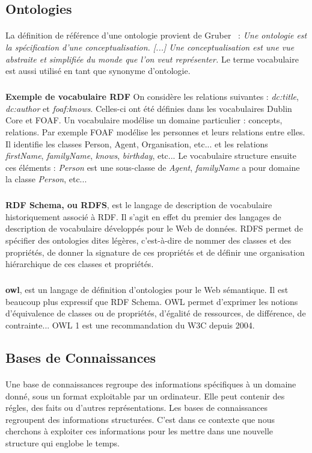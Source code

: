 \documentclass[12pt,a4]{report}
\begin{document}
\subsection{Ontologies}
\paragraph{}
La définition de référence d’une ontologie provient de Gruber~\cite{gruber1995}  : {\it Une ontologie est la spécification d’une conceptualisation. [...] Une conceptualisation est une vue abstraite et simplifiée du monde que l’on veut représenter.} Le terme vocabulaire est aussi utilisé en tant que synonyme d’ontologie.
\subparagraph{}
\textbf{Exemple de vocabulaire RDF} On considère les relations suivantes : \textit{dc:title}, \textit{dc:author} et \textit{foaf:knows}. Celles-ci ont été définies dans les vocabulaires Dublin Core et FOAF. Un vocabulaire modélise un domaine particulier : concepts, relations. Par exemple FOAF modélise les personnes et leurs relations entre elles. Il identifie les classes Person, Agent, Organisation, etc... et les relations \textit{firstName}, \textit{familyName}, \textit{knows}, \textit{birthday}, etc... Le vocabulaire structure ensuite ces  éléments : \textit{Person} est une sous-classe de \textit{Agent}, \textit{familyName} a pour domaine la classe \textit{Person}, etc...
\subparagraph{}
\textbf{RDF Schema, ou RDFS}, est le langage de description de vocabulaire historiquement associé à RDF. Il s'agit en effet du premier des langages de description de vocabulaire développés pour le Web de données. RDFS permet de spécifier des ontologies dites légères, c'est-à-dire de nommer des classes et des propriétés, de donner la signature de ces propriétés et de définir une organisation hiérarchique de ces classes et propriétés.
\subparagraph{}
\textbf{\gls{owl}}, est un langage de définition d'ontologies pour le Web sémantique. Il est beaucoup plus expressif que RDF Schema. OWL permet d'exprimer les notions d'équivalence de classes ou de propriétés, d'égalité de ressources, de différence, de contrainte... OWL 1 est une recommandation du W3C depuis 2004.
\newpage
\subsection{Bases de Connaissances}
\paragraph{}
Une base de connaissances regroupe des informations spécifiques à un domaine donné, sous un format exploitable par un ordinateur. Elle peut contenir des régles, des faits ou d'autres représentations. Les bases de connaissances regroupent des informations structurées. C’est dans ce contexte que nous cherchons à exploiter ces informations pour les mettre dans une nouvelle structure qui englobe le temps.
\end{document}
